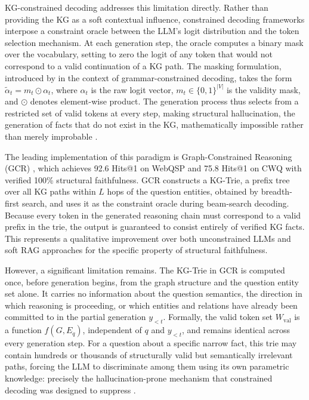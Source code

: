 KG-constrained decoding addresses this limitation directly. Rather than providing the KG as a soft contextual influence, constrained decoding frameworks interpose a constraint oracle between the LLM's logit distribution and the token selection mechanism. At each generation step, the oracle computes a binary mask over the vocabulary, setting to zero the logit of any token that would not correspond to a valid continuation of a KG path. The masking formulation, introduced by \citet{geng2023gcd} in the context of grammar-constrained decoding, takes the form $\tilde{\alpha}_t = m_t \odot \alpha_t$, where $\alpha_t$ is the raw logit vector, $m_t \in \{0,1\}^{\lvert V \rvert}$ is the validity mask, and $\odot$ denotes element-wise product. The generation process thus selects from a restricted set of valid tokens at every step, making structural hallucination, the generation of facts that do not exist in the KG, mathematically impossible rather than merely improbable \citep{willard2023outlines,geng2023gcd}.

The leading implementation of this paradigm is Graph-Constrained Reasoning (GCR) \citep{luo2024gcr}, which achieves 92.6 Hits@1 on WebQSP and 75.8 Hits@1 on CWQ with verified 100\% structural faithfulness. GCR constructs a KG-Trie, a prefix tree \citep{fredkin1960trie} over all KG paths within $L$ hops of the question entities, obtained by breadth-first search, and uses it as the constraint oracle during beam-search decoding. Because every token in the generated reasoning chain must correspond to a valid prefix in the trie, the output is guaranteed to consist entirely of verified KG facts. This represents a qualitative improvement over both unconstrained LLMs and soft RAG approaches for the specific property of structural faithfulness.

However, a significant limitation remains. The KG-Trie in GCR is computed once, before generation begins, from the graph structure and the question entity set alone. It carries no information about the question semantics, the direction in which reasoning is proceeding, or which entities and relations have already been committed to in the partial generation $y_{<t}$. Formally, the valid token set $W_{\mathrm{val}}$ is a function $f(G, E_q)$, independent of $q$ and $y_{<t}$, and remains identical across every generation step. For a question about a specific narrow fact, this trie may contain hundreds or thousands of structurally valid but semantically irrelevant paths, forcing the LLM to discriminate among them using its own parametric knowledge: precisely the hallucination-prone mechanism that constrained decoding was designed to suppress \citep{li2024dog,luo2024gcr}.

